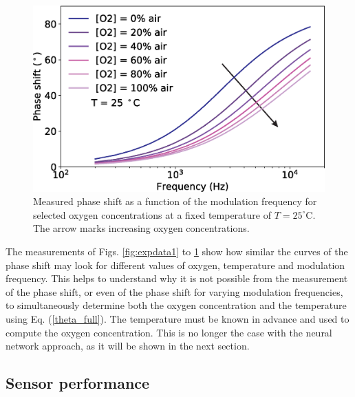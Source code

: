 \documentclass[9pt,twocolumn,twoside,pdftex]{optica}
\begin{document}
\begin{figure}[t!]
\centering
\includegraphics[width=8.2 cm]{phase_f_O2.eps}
\caption{Measured phase shift as a function of the modulation frequency for selected oxygen concentrations at a fixed temperature of $T=25 ^{\circ}$C. The arrow marks increasing oxygen concentrations.}
\label{fig:expdata3}
\end{figure}

The measurements of Figs. \ref{fig:expdata1} to \ref{fig:expdata3} show how similar the curves of the phase shift may look for different values of oxygen, temperature and modulation frequency. This helps to understand why it is not possible from the measurement of the phase shift, or even of the phase shift for varying modulation frequencies, to simultaneously determine both the oxygen concentration and the temperature using Eq. (\ref{theta_full}). The temperature must be known in advance and used to compute the oxygen concentration. This is no longer the case with the neural network approach, as it will be shown in the next section. 


\subsection{Sensor performance}
\end{document}
